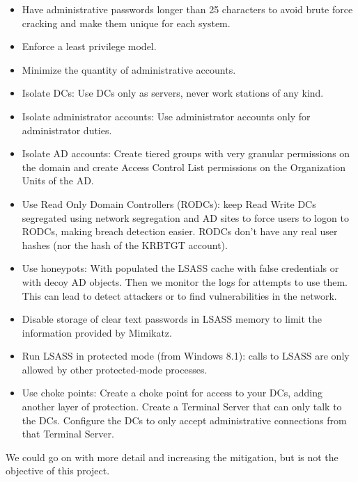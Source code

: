 \begin{itemize}
	\item Have administrative passwords longer than 25 characters to avoid brute force cracking and make them unique for each system.
	\item Enforce a least privilege model.
	\item Minimize the quantity of administrative accounts.
	\item Isolate DCs: Use DCs only as servers, never work stations of any kind.
	\item Isolate administrator accounts: Use administrator accounts only for administrator duties.
	\item Isolate AD accounts: Create tiered groups with very granular permissions on the domain and create Access Control List permissions on the Organization Units of the AD\cite{AD_tier}.
	\item Use Read Only Domain Controllers (RODCs): keep Read Write DCs segregated using network segregation and AD sites to force users to logon to RODCs, making breach detection easier. RODCs don't have any real user hashes (nor the hash of the KRBTGT account)\cite{reset_RODC}\cite{hood}.
	\item Use honeypots: With populated the LSASS cache with false credentials\cite{SANS_mimikatz}\cite{honeyhashes} or with decoy AD objects\cite{decoy_AD}. Then we monitor the logs for attempts to use them. This can lead to detect attackers or to find vulnerabilities in the network.
	\item Disable storage of clear text passwords in LSASS memory to limit the information provided by Mimikatz\cite{SANS_mimikatz}.
	\item Run LSASS in protected mode (from Windows 8.1): calls to LSASS are only allowed by other protected-mode processes\cite{SANS_mimikatz}\cite{understanding_powersploit_mimikatz}.
	\item Use choke points: Create a choke point for access to your DCs, adding another layer of protection. Create a Terminal Server that can only talk to the DCs. Configure the DCs to only accept administrative connections from that Terminal Server\cite{choke}.
\end{itemize}
\linej
We could go on with more detail and increasing the mitigation\cite{AD_defense}, but is not the objective of this project.

